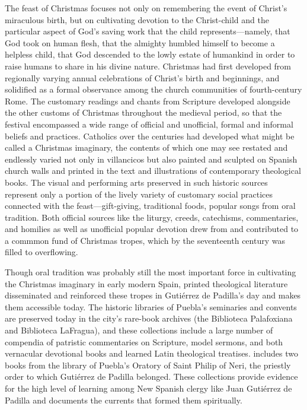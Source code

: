 The feast of Christmas focuses not only on remembering the event of Christ's
miraculous birth, but on cultivating devotion to the Christ-child and the
particular aspect of God's saving work that the child represents---namely, that
God took on human flesh, that the almighty humbled himself to become a helpless
child, that God descended to the lowly estate of humankind in order to raise
humans to share in his divine nature.
Christmas had first developed from regionally varying annual celebrations of
Christ's birth and beginnings, and solidified as a formal observance among the
church communities of fourth-century Rome.%
    \Autocites
    [85--140]{Talley:LiturgicalYear}
    [86--89]{Bradshaw:EarlyWorship}
    {Roll:OriginsChristmas}
The customary readings and chants from Scripture developed alongside the other
customs of Christmas throughout the medieval period, so that the festival
encompassed a wide range of official and unofficial, formal and informal beliefs
and practices.
Catholics over the centuries had developed what might be called a Christmas
imaginary, the contents of which one may see restated and endlessly varied not
only in villancicos but also painted and sculpted on Spanish church walls and
printed in the text and illustrations of contemporary theological books.
The visual and performing arts preserved in such historic sources represent only
a portion of the lively variety of customary social practices connected with the
feast---gift-giving, traditional foods, popular songs from oral tradition.
Both official sources like the liturgy, creeds, catechisms, commentaries, and
homilies as well as unofficial popular devotion drew from and contributed to a
commmon fund of Christmas tropes, which by the seventeenth century was filled to
overflowing.

Though oral tradition was probably still the most important force in cultivating
the Christmas imaginary in early modern Spain, printed theological literature
disseminated and reinforced these tropes in Gutiérrez de Padilla's day and makes
them accessible today.
The historic libraries of Puebla's seminaries and convents are preserved today
in the city's rare-book archives (the Biblioteca Palafoxiana and Biblioteca
LaFragua), and these collections include a large number of compendia of
patristic commentaries on Scripture, model sermons, and both vernacular
devotional books and learned Latin theological treatises.%
    \Autocites
    [On patristic exegesis and its influence, see][]
    {Kannengiesser:PatristicExegesis}
    {McKim:BiblicalInterpreters}
    {Thompson:ReadingwDead}
 includes two books from the library of Puebla's
Oratory of Saint Philip of Neri, the priestly order to which Gutiérrez de
Padilla belonged.%
    \Autocite{Mauleon:PadillaCivil}
These collections provide evidence for the high level of learning among New
Spanish clergy like Juan Gutiérrez de Padilla and documents the currents that
formed them spiritually.

